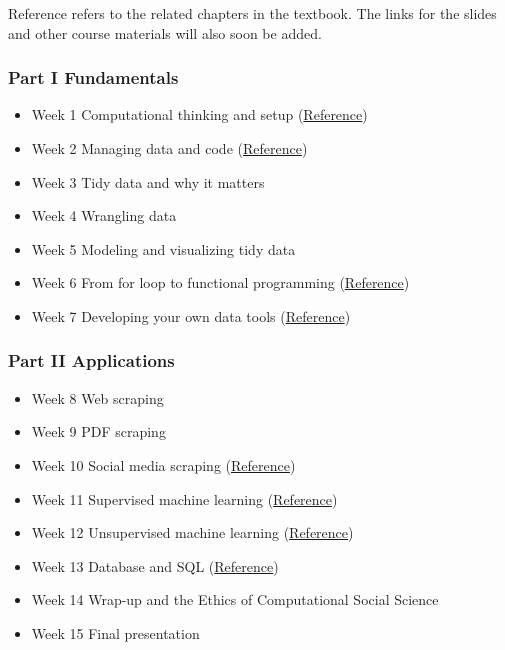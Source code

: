 \documentclass[
]{article}
\providecommand{\tightlist}{%
  \setlength{\itemsep}{0pt}\setlength{\parskip}{0pt}}
\begin{document}
Reference refers to the related chapters in the textbook. The links for
the slides and other course materials will also soon be added.

\hypertarget{part-i-fundamentals-1}{%
\subsubsection{Part I Fundamentals}\label{part-i-fundamentals-1}}

\begin{itemize}
\tightlist
\item
  Week 1 Computational thinking and setup
  (\href{https://jaeyk.github.io/PS239T/motivation.html}{Reference})
\item
  Week 2 Managing data and code
  (\href{https://jaeyk.github.io/PS239T/git-bash.html}{Reference})
\item
  Week 3 Tidy data and why it matters
\item
  Week 4 Wrangling data
\item
  Week 5 Modeling and visualizing tidy data
\item
  Week 6 From for loop to functional programming
  (\href{https://jaeyk.github.io/PS239T/functional-programming.html}{Reference})
\item
  Week 7 Developing your own data tools
  (\href{https://jaeyk.github.io/PS239T/functional-programming.html\#developing-your-own-data-products}{Reference})
\end{itemize}

\hypertarget{part-ii-applications-1}{%
\subsubsection{Part II Applications}\label{part-ii-applications-1}}

\begin{itemize}
\tightlist
\item
  Week 8 Web scraping
\item
  Week 9 PDF scraping
\item
  Week 10 Social media scraping
  (\href{https://jaeyk.github.io/PS239T/semi-structured-data.html\#xmljson-government-databasesocial-media-scraping}{Reference})
\item
  Week 11 Supervised machine learning
  (\href{https://jaeyk.github.io/PS239T/machine-learning.html\#supervised-learning}{Reference})
\item
  Week 12 Unsupervised machine learning
  (\href{https://jaeyk.github.io/PS239T/machine-learning.html\#unsupervised-learning}{Reference})
\item
  Week 13 Database and SQL
  (\href{https://jaeyk.github.io/PS239T/git-bash.html}{Reference})
\item
  Week 14 Wrap-up and the Ethics of Computational Social Science
\item
  Week 15 Final presentation
\end{itemize}
\end{document}

